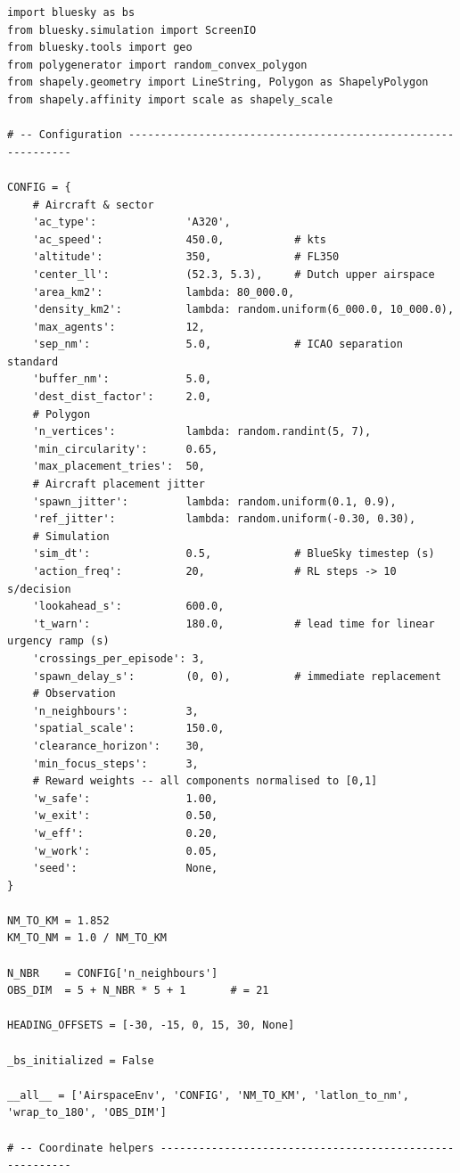 \documentclass[10pt, a4paper]{article}
\begin{document}
\begin{lstlisting}[caption={v3\_simple\_env.py --- ATCO conflict-resolution environment}, label=lst:env]
import bluesky as bs
from bluesky.simulation import ScreenIO
from bluesky.tools import geo
from polygenerator import random_convex_polygon
from shapely.geometry import LineString, Polygon as ShapelyPolygon
from shapely.affinity import scale as shapely_scale

# -- Configuration -------------------------------------------------------------

CONFIG = {
    # Aircraft & sector
    'ac_type':              'A320',
    'ac_speed':             450.0,           # kts
    'altitude':             350,             # FL350
    'center_ll':            (52.3, 5.3),     # Dutch upper airspace
    'area_km2':             lambda: 80_000.0,
    'density_km2':          lambda: random.uniform(6_000.0, 10_000.0),
    'max_agents':           12,
    'sep_nm':               5.0,             # ICAO separation standard
    'buffer_nm':            5.0,
    'dest_dist_factor':     2.0,
    # Polygon
    'n_vertices':           lambda: random.randint(5, 7),
    'min_circularity':      0.65,
    'max_placement_tries':  50,
    # Aircraft placement jitter
    'spawn_jitter':         lambda: random.uniform(0.1, 0.9),
    'ref_jitter':           lambda: random.uniform(-0.30, 0.30),
    # Simulation
    'sim_dt':               0.5,             # BlueSky timestep (s)
    'action_freq':          20,              # RL steps -> 10 s/decision
    'lookahead_s':          600.0,
    't_warn':               180.0,           # lead time for linear urgency ramp (s)
    'crossings_per_episode': 3,
    'spawn_delay_s':        (0, 0),          # immediate replacement
    # Observation
    'n_neighbours':         3,
    'spatial_scale':        150.0,
    'clearance_horizon':    30,
    'min_focus_steps':      3,
    # Reward weights -- all components normalised to [0,1]
    'w_safe':               1.00,
    'w_exit':               0.50,
    'w_eff':                0.20,
    'w_work':               0.05,
    'seed':                 None,
}

NM_TO_KM = 1.852
KM_TO_NM = 1.0 / NM_TO_KM

N_NBR    = CONFIG['n_neighbours']
OBS_DIM  = 5 + N_NBR * 5 + 1       # = 21

HEADING_OFFSETS = [-30, -15, 0, 15, 30, None]

_bs_initialized = False

__all__ = ['AirspaceEnv', 'CONFIG', 'NM_TO_KM', 'latlon_to_nm', 'wrap_to_180', 'OBS_DIM']

# -- Coordinate helpers --------------------------------------------------------


\end{lstlisting}
\end{document}
